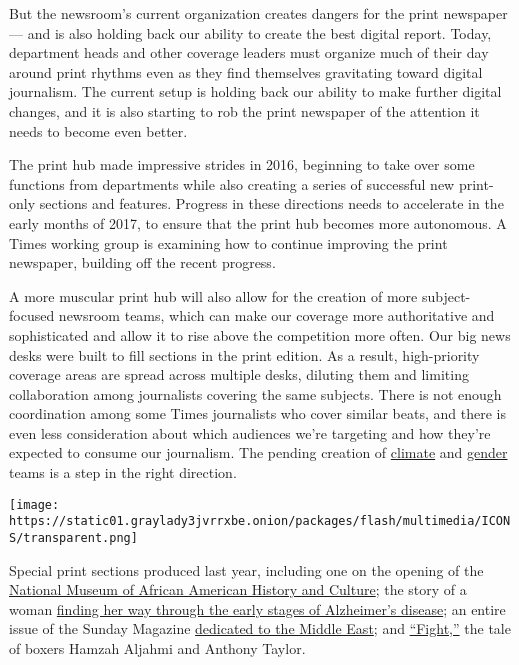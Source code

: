 But the newsroom's current organization creates dangers for the print
newspaper --- and is also holding back our ability to create the best
digital report. Today, department heads and other coverage leaders must
organize much of their day around print rhythms even as they find
themselves gravitating toward digital journalism. The current setup is
holding back our ability to make further digital changes, and it is also
starting to rob the print newspaper of the attention it needs to become
even better.

The print hub made impressive strides in 2016, beginning to take over
some functions from departments while also creating a series of
successful new print-only sections and features. Progress in these
directions needs to accelerate in the early months of 2017, to ensure
that the print hub becomes more autonomous. A Times working group is
examining how to continue improving the print newspaper, building off
the recent progress.

A more muscular print hub will also allow for the creation of more
subject-focused newsroom teams, which can make our coverage more
authoritative and sophisticated and allow it to rise above the
competition more often. Our big news desks were built to fill sections
in the print edition. As a result, high-priority coverage areas are
spread across multiple desks, diluting them and limiting collaboration
among journalists covering the same subjects. There is not enough
coordination among some Times journalists who cover similar beats, and
there is even less consideration about which audiences we're targeting
and how they're expected to consume our journalism. The pending creation
of
\href{https://www.nytimes3xbfgragh.onion/interactive/2016/jobs/nyt-climate-change-editor.html}{climate}
and
\href{https://www.nytimes3xbfgragh.onion/interactive/2016/jobs/nyt-gender-editor.html}{gender}
teams is a step in the right direction.

\texttt{[image: https://static01.graylady3jvrrxbe.onion/packages/flash/multimedia/ICONS/transparent.png]}

Special print sections produced last year, including one on the opening
of the
\href{https://www.nytimes3xbfgragh.onion/interactive/2016/09/15/arts/design/national-museum-of-african-american-history-and-culture.html}{National
Museum of African American History and Culture}; the story of a woman
\href{https://www.nytimes3xbfgragh.onion/interactive/2016/05/01/nyregion/living-with-alzheimers.html}{finding
her way through the early stages of Alzheimer's disease}; an entire
issue of the Sunday Magazine
\href{https://www.nytimes3xbfgragh.onion/interactive/2016/08/11/magazine/isis-middle-east-arab-spring-fractured-lands.html}{dedicated
to the Middle East}; and
\href{https://www.nytimes3xbfgragh.onion/2016/03/28/sports/boxing-youngstown-anthony-taylor-hamzah-aljahmi.html}{``Fight,''}
the tale of boxers Hamzah Aljahmi and Anthony Taylor.


